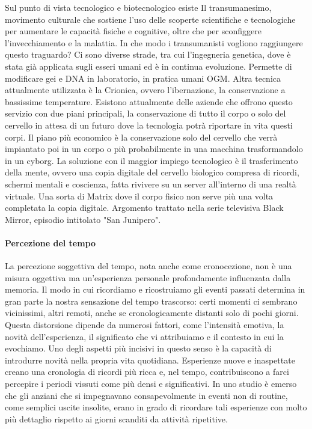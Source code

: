 \documentclass[12pt]{book} %
\begin{document}
Sul punto di vista tecnologico e biotecnologico esiste Il transumanesimo, movimento culturale che sostiene l'uso delle scoperte scientifiche e tecnologiche per aumentare le capacità fisiche e cognitive, oltre che per sconfiggere l'invecchiamento e la
malattia. In che modo i transumanisti vogliono raggiungere questo traguardo? Ci sono diverse strade, tra cui
l'ingegneria genetica, dove è stata già applicata sugli esseri umani ed è in continua evoluzione.
Permette di modificare gei e DNA in laboratorio, in pratica umani OGM. Altra tecnica attualmente utilizzata è la
Crionica, ovvero l'ibernazione, la conservazione a bassissime temperature. Esistono attualmente
delle aziende che offrono questo servizio con due piani principali, la conservazione di tutto il corpo o solo del
cervello in attesa di un futuro dove la tecnologia potrà riportare in vita questi corpi. Il piano più economico è la
conservazione solo del cervello che verrà impiantato poi in un corpo o più probabilmente in una macchina trasformandolo
in un cyborg. La soluzione con il maggior impiego tecnologico è il trasferimento della mente, ovvero una copia digitale
del cervello biologico compresa di ricordi, schermi mentali e coscienza, fatta rivivere su un server
all'interno di una realtà virtuale. Una sorta di Matrix dove il corpo fisico non serve più una
volta completata la copia digitale. Argomento trattato nella serie televisiva Black Mirror, episodio intitolato "San Junipero".

\paragraph{Percezione del tempo}

La percezione soggettiva del tempo, nota anche come cronocezione, non è una misura oggettiva ma un’esperienza personale profondamente influenzata dalla memoria. Il modo in cui ricordiamo e ricostruiamo gli eventi passati determina in gran parte la nostra sensazione del tempo trascorso: certi momenti ci sembrano vicinissimi, altri remoti, anche se cronologicamente distanti solo di pochi giorni. Questa distorsione dipende da numerosi fattori, come l’intensità emotiva, la novità dell’esperienza, il significato che vi attribuiamo e il contesto in cui la evochiamo.
Uno degli aspetti più incisivi in questo senso è la capacità di introdurre novità nella propria vita quotidiana. Esperienze nuove e inaspettate creano una cronologia di ricordi più ricca  e, nel tempo, contribuiscono a farci percepire i periodi vissuti come più densi e significativi. In uno studio è emerso che gli anziani che si impegnavano consapevolmente in eventi non di routine, come semplici uscite insolite, erano in grado di ricordare tali esperienze con molto più dettaglio rispetto ai giorni scanditi da attività ripetitive. 
\end{document}
